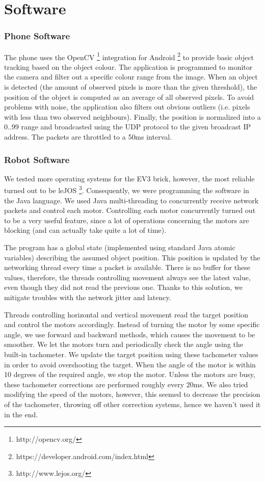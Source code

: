 \documentclass{article}
\begin{document}
\section{Software}

\subsubsection{Phone Software}

The phone uses the OpenCV \footnote{http://opencv.org/} integration for Android \footnote{https://developer.android.com/index.html} to provide basic object tracking based on the object colour. The application is programmed to monitor the camera and filter out a specific colour range from the image. When an object is detected (the amount of observed pixels is more than the given threshold), the position of the object is computed as an average of all observed pixels. To avoid problems with noise, the application also filters out obvious outliers (i.e. pixels with less than two observed neighbours). Finally, the position is normalized into a $0..99$ range and broadcasted using the UDP protocol to the given broadcast IP address. The packets are throttled to a 50ms interval.

\subsubsection{Robot Software}

We tested more operating systems for the EV3 brick, however, the most reliable turned out to be leJOS \footnote{http://www.lejos.org/}. Consequently, we were programming the software in the Java language. We used Java multi-threading to concurrently receive network packets and control each motor. Controlling each motor concurrently turned out to be a very useful feature, since a lot of operations concerning the motors are blocking (and can actually take quite a lot of time).

The program has a global state (implemented using standard Java atomic variables) describing the assumed object position. This position is updated by the networking thread every time a packet is available. There is no buffer for these values, therefore, the threads controlling movement always see the latest value, even though they did not read the previous one. Thanks to this solution, we mitigate troubles with the network jitter and latency.
 
Threads controlling horizontal and vertical movement read the target position and control the motors accordingly. Instead of turning the motor by some specific angle, we use forward and backward methods, which causes the movement to be smoother. We let the motors turn and periodically check the angle using the built-in tachometer. We update the target position using these tachometer values in order to avoid overshooting the target. When the angle of the motor is within 10 degrees of the required angle, we stop the motor. Unless the motors are busy, these tachometer corrections are performed roughly every 20ms. We also tried modifying the speed of the motors, however, this seemed to decrease the precision of the tachometer, throwing off other correction systems, hence we haven't used it in the end.
 
\end{document}
